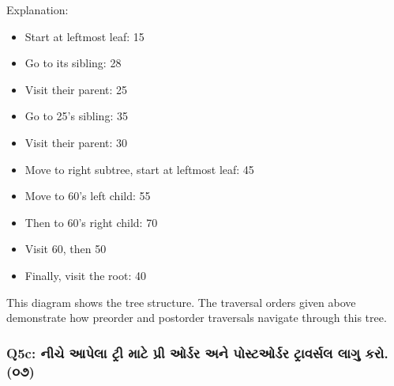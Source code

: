 \begin{enumerate}
  Explanation:

  \begin{itemize}
  \tightlist
  \item
    Start at leftmost leaf: 15
  \item
    Go to its sibling: 28
  \item
    Visit their parent: 25
  \item
    Go to 25's sibling: 35
  \item
    Visit their parent: 30
  \item
    Move to right subtree, start at leftmost leaf: 45
  \item
    Move to 60's left child: 55
  \item
    Then to 60's right child: 70
  \item
    Visit 60, then 50
  \item
    Finally, visit the root: 40
  \end{itemize}
\end{enumerate}

\begin{Shaded}
\begin{Highlighting}[]
    
\end{Highlighting}
\end{Shaded}

This diagram shows the tree structure. The traversal orders given above
demonstrate how preorder and postorder traversals navigate through this
tree.

\hypertarget{q5c-uxaa8uxa9a-uxa86uxaaauxab2-uxa9fuxab0-uxaaeuxa9f-uxaaauxab0-uxa93uxab0uxaa1uxab0-uxa85uxaa8-uxaaauxab8uxa9fuxa93uxab0uxaa1uxab0-uxa9fuxab0uxab5uxab0uxab8uxab2-uxab2uxa97-uxa95uxab0.-uxae6uxaed}{%
\subsubsection{Q5c: નીચે આપેલા ટ્રી માટે પ્રી ઓર્ડર અને પોસ્ટઓર્ડર ટ્રાવર્સલ લાગુ
કરો.
(૦૭)}\label{q5c-uxaa8uxa9a-uxa86uxaaauxab2-uxa9fuxab0-uxaaeuxa9f-uxaaauxab0-uxa93uxab0uxaa1uxab0-uxa85uxaa8-uxaaauxab8uxa9fuxa93uxab0uxaa1uxab0-uxa9fuxab0uxab5uxab0uxab8uxab2-uxab2uxa97-uxa95uxab0.-uxae6uxaed}}

